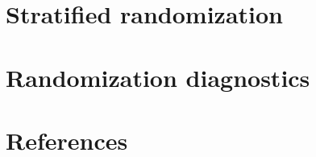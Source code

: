 \documentclass[
]{book}
\begin{document}
\hypertarget{stratified-randomization}{%
\section{Stratified randomization}\label{stratified-randomization}}

\hypertarget{randomization-diagnostics}{%
\section{Randomization diagnostics}\label{randomization-diagnostics}}

\hypertarget{references}{%
\section*{References}\label{references}}

  
\end{document}

